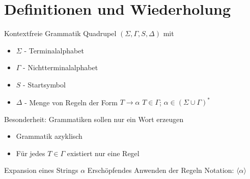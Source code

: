 \section{Definitionen und Wiederholung}
\begin{frame}{\FrameName}
	\begin{block}{Kontextfreie Grammatik}
		\Gap
		Quadrupel $(\Sigma,\Gamma,S,\Delta)$ mit
		\begin{itemize}
			\item $\Sigma$ - Terminalalphabet
			\item $\Gamma$ - Nichtterminalalphabet
			\item $S$ - Startsymbol
			\item $\Delta$ - Menge von Regeln der Form $T\rightarrow\alpha$\linebreak
			$T \in \Gamma$;
			$\alpha \in (\Sigma \cup \Gamma)^\ast$
		\end{itemize}
	\end{block}
	
\end{frame}

\begin{frame}{\FrameName}
\begin{alert}{Besonderheit:}
	\Gap
	Grammatiken sollen nur ein Wort erzeugen 
	\begin{itemize}
		
		\item Grammatik azyklisch
		\item Für jedes $T \in \Gamma$ existiert nur eine Regel
	\end{itemize}
\end{alert}
\end{frame}

\begin{frame}{\FrameName}
\begin{block}{Expansion  eines Strings $\alpha$}
	\Gap
	Erschöpfendes Anwenden der Regeln \linebreak
	Notation: \alert{$\langle \alpha \rangle$}

\end{block}
\end{frame}

